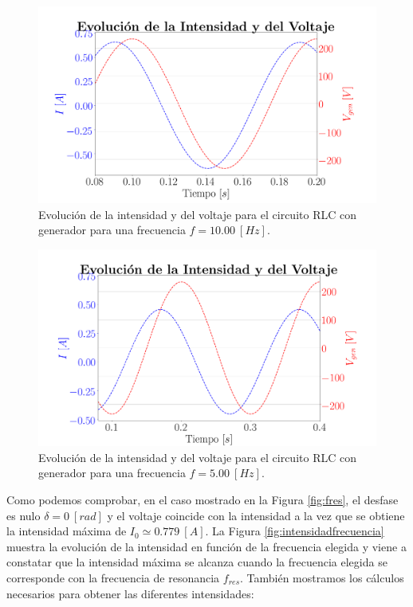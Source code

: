 \documentclass[journal]{IEEEtran}
\begin{document}
\begin{figure}[!htb]
    \centering
    \includegraphics[width=\linewidth,trim={60 0 70 55},clip]{f10.png}
    \caption{Evolución de la intensidad y del voltaje para el circuito RLC con generador para una frecuencia $f = 10.00~[Hz]$.}
    \label{fig:f10}
\end{figure}

\newpage

\begin{figure}[!htb]
    \centering
    \includegraphics[width=\linewidth,trim={0 0 0 55},clip]{f5.png}
    \caption{Evolución de la intensidad y del voltaje para el circuito RLC con generador para una frecuencia $f = 5.00~[Hz]$.}
    \label{fig:f5}
\end{figure}

Como podemos comprobar, en el caso mostrado en la Figura \ref{fig:fres}, el desfase es nulo $\delta = 0~[rad]$ y el voltaje coincide con la intensidad a la vez que se obtiene la intensidad máxima de $I_0 \simeq 0.779~[A]$. La Figura \ref{fig:intensidadfrecuencia} muestra la evolución de la intensidad en función de la frecuencia elegida y viene a constatar que la intensidad máxima se alcanza cuando la frecuencia elegida se corresponde con la frecuencia de resonancia $f_{res}$. También mostramos los cálculos necesarios para obtener las diferentes intensidades:
\end{document}
